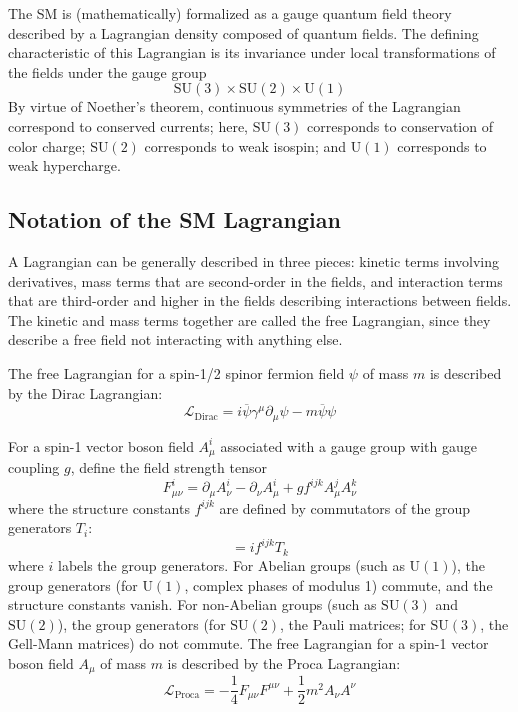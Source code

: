 The SM is (mathematically) formalized as a gauge quantum field theory described by a Lagrangian density composed of quantum fields.
The defining characteristic of this Lagrangian is its invariance under local transformations of the fields under the gauge group
\begin{equation}
  \mathrm{SU}(3)\times\mathrm{SU}(2)\times\mathrm{U}(1)
  \label{eq:sm:gaugegroup}
\end{equation}
By virtue of Noether's theorem, continuous symmetries of the Lagrangian correspond to conserved currents; here, $\mathrm{SU}(3)$ corresponds to conservation of color charge; $\mathrm{SU}(2)$ corresponds to weak isospin; and $\mathrm{U}(1)$ corresponds to weak hypercharge.

\subsection{Notation of the SM Lagrangian}
A Lagrangian can be generally described in three pieces: kinetic terms involving derivatives, mass terms that are second-order in the fields, and interaction terms that are third-order and higher in the fields describing interactions between fields.
The kinetic and mass terms together are called the free Lagrangian, since they describe a free field not interacting with anything else.

The free Lagrangian for a spin-1/2 spinor fermion field $\psi$ of mass $m$ is described by the Dirac Lagrangian:
\begin{equation}
  \mathcal{L}_\text{Dirac} = i\overline{\psi}\gamma^\mu\partial_\mu\psi - m\overline{\psi}\psi
  \label{eq:sm:dirac}
\end{equation}

For a spin-1 vector boson field $A_\mu^i$ associated with a gauge group with gauge coupling $g$, define the field strength tensor
\begin{equation}
  F_{\mu\nu}^i = \partial_\mu A_\nu^i - \partial_\nu A_\mu^i + g f^{ijk} A_\mu^j A_\nu^k
  \label{eq:sm:fieldstrength}
\end{equation}
where the structure constants $f^{ijk}$ are defined by commutators of the group generators $T_i$:
\begin{equation}
  [T_i, T_j] = if^{ijk}T_k
  \label{eq:sm:structureconstants}
\end{equation}
where $i$ labels the group generators.
For Abelian groups (such as $\mathrm{U}(1)$), the group generators (for $\mathrm{U}(1)$, complex phases of modulus 1) commute, and the structure constants vanish.
For non-Abelian groups (such as $\mathrm{SU}(3)$ and $\mathrm{SU}(2)$), the group generators (for $\mathrm{SU}(2)$, the Pauli matrices; for $\mathrm{SU}(3)$, the Gell-Mann matrices) do not commute.
The free Lagrangian for a spin-1 vector boson field $A_\mu$ of mass $m$ is described by the Proca Lagrangian:
\begin{equation}
  \mathcal{L}_\text{Proca} = -\frac14 F_{\mu\nu}F^{\mu\nu} + \frac12m^2A_{\nu}A^\nu
  \label{eq:sm:proca}
\end{equation}

